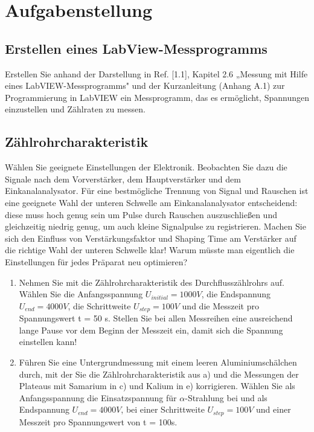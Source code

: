 \section{Aufgabenstellung}

\renewcommand{\labelenumi}{\alph{enumi})}

\subsection{Erstellen eines LabView-Messprogramms}
Erstellen Sie anhand der Darstellung in Ref. [1.1], Kapitel 2.6 „Messung mit Hilfe
eines LabVIEW-Messprogramms" und der Kurzanleitung (Anhang A.1) zur
Programmierung in LabVIEW ein Messprogramm, das es ermöglicht, Spannungen
einzustellen und Zählraten zu messen.

\subsection{Zählrohrcharakteristik}
Wählen Sie geeignete Einstellungen der Elektronik. Beobachten Sie dazu die Signale nach dem Vorverstärker, dem Hauptverstärker und dem Einkanalanalysator. Für eine bestmögliche Trennung von Signal und Rauschen ist eine geeignete Wahl der unteren Schwelle am Einkanalanalysator entscheidend: diese muss hoch genug sein
um Pulse durch Rauschen auszuschließen und gleichzeitig niedrig genug, um auch kleine Signalpulse zu registrieren. Machen Sie sich den Einfluss von Verstärkungsfaktor und Shaping Time am Verstärker auf die richtige Wahl der unteren Schwelle klar! Warum müsste man eigentlich die Einstellungen für jedes Präparat neu optimieren?
\begin{enumerate}
 \item Nehmen Sie mit  die Zählrohrcharakteristik des Durchflusszählrohrs auf.
Wählen Sie die Anfangsspannung $U_{initial} = 1000 V$, die Endspannung $U_{end} = 4000 V$, die Schrittweite $U_{step} = 100 V$ und die Messzeit pro Spannungswert t = 50 s. Stellen Sie bei allen Messreihen eine ausreichend lange Pause vor dem Beginn der Messzeit ein, damit sich die Spannung einstellen kann!

\item Führen Sie eine Untergrundmessung mit einem leeren Aluminiumschälchen durch, mit der Sie die Zählrohrcharakteristik aus a) und die Messungen der Plateaus mit Samarium in c) und Kalium in e) korrigieren. Wählen Sie als Anfangsspannung die Einsatzspannung für $\alpha$-Strahlung bei  und als Endspannung $U_{end} = 4000 V$, bei einer Schrittweite $U_{step} = 100 V$ und einer Messzeit pro Spannungswert von t = 100s.

\end{enumerate}

